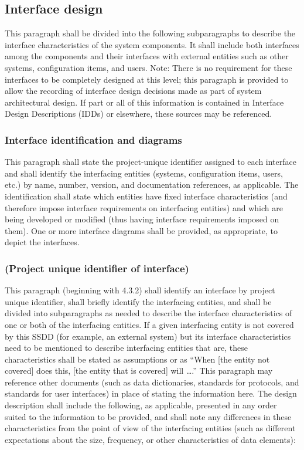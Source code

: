 \subsection{Interface design}

This paragraph shall be divided into the following subparagraphs to
describe the interface characteristics of the system components. It
shall include both interfaces among the components and their interfaces
with external entities such as other systems, configuration items, and
users. Note: There is no requirement for these interfaces to be
completely designed at this level; this paragraph is provided to allow
the recording of interface design decisions made as part of system
architectural design. If part or all of this information is contained in
Interface Design Descriptions (IDDs) or elsewhere, these sources may be
referenced.

\subsubsection{Interface identification and diagrams}

This paragraph shall state the project-unique identifier assigned to
each interface and shall identify the interfacing entities (systems,
configuration items, users, etc.) by name, number, version, and
documentation references, as applicable. The identification shall state
which entities have fixed interface characteristics (and therefore
impose interface requirements on interfacing entities) and which are
being developed or modified (thus having interface requirements imposed
on them). One or more interface diagrams shall be provided, as
appropriate, to depict the interfaces.

\subsubsection{(Project unique identifier of interface)}

This paragraph (beginning with 4.3.2) shall identify an interface by
project unique identifier, shall briefly identify the interfacing
entities, and shall be divided into subparagraphs as needed to describe
the interface characteristics of one or both of the interfacing
entities. If a given interfacing entity is not covered by this SSDD (for
example, an external system) but its interface characteristics need to
be mentioned to describe interfacing entities that are, these
characteristics shall be stated as assumptions or as ``When {[}the
entity not covered{]} does this, {[}the entity that is covered{]} will
\ldots{}.'' This paragraph may reference other documents (such as data
dictionaries, standards for protocols, and standards for user
interfaces) in place of stating the information here. The design
description shall include the following, as applicable, presented in any
order suited to the information to be provided, and shall note any
differences in these characteristics from the point of view of the
interfacing entities (such as different expectations about the size,
frequency, or other characteristics of data elements):

